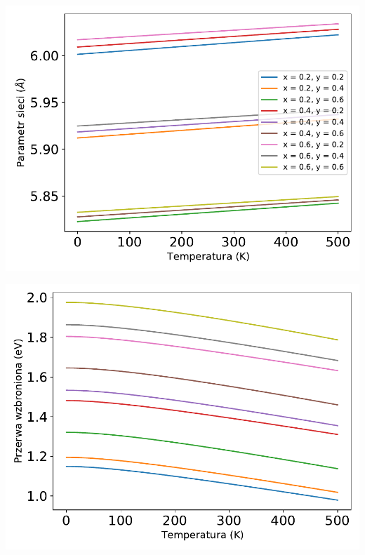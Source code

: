 \documentclass[12pt,openany,a4paper]{book}
\begin{document}
\begin{minipage}[t]{0.5\textwidth}
	\includegraphics[width = 0.9\linewidth]{Figures/strain/alc2.pdf}\label{fig:alc2}
\end{minipage}
\begin{minipage}[t]{0.5\textwidth}
	\includegraphics[width = 0.9\linewidth]{Figures/strain/eg2.pdf}\label{fig:eg2}
\end{minipage}
\end{document}
